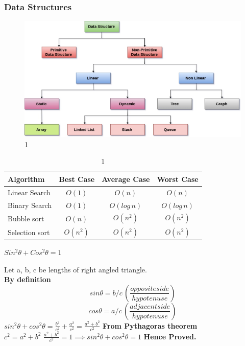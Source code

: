 \documentclass{beamer}
\begin{document}
	\begin{frame}
		\frametitle{Data Structures}
		\begin{figure}
			\includegraphics[scale=0.28]{image 1.jpeg}
			\caption{1}
		\end{figure}
	\end{frame}
	\begin{frame}
		\begin{center}
			\begin{table}
				\begin{tabular}{|l|c|c|c|}
					\hline
					Algorithm & Best Case & Average Case & Worst Case \\ 
					\hline \hline
					Linear Search & $O(1)$ & $O(n)$ & $O(n)$ \\
					Binary Search & $O(1)$ & $O(log\,n)$ & $O(log\,n)$ \\
					Bubble sort & $O(n)$ & $O(n^2)$ & $O(n^2)$ \\ 
					Selection sort & $O(n^2)$ & $O(n^2)$ & $O(n^2)$ \\
					\hline    
				\end{tabular}
				\caption{1}
			\end{table}
		\end{center}
		\begin{theorem}
			$Sin^2 \theta + Cos^2 \theta = 1$
		\end{theorem}
	\end{frame}
	\begin{frame}
		\begin{theorem}
			Let a, b, c be lengths of right angled triangle.\\
			\textbf{By definition}
			$$sin \theta = b/c \, \left(\frac{oppositeside}{hypotenuse}\right)$$
			$$cos \theta = a/c \, \left(\frac{adjacentside}{hypotenuse}\right)$$
			$sin^2 \theta + cos^2 \theta = \frac{b^2}{c^2} + \frac{a^2}{c^2} = \frac{a^2+b^2}{c^2}$ \newline \newline
			\textbf{From Pythagoras theorem} \\ \vspace{0.4cm}
			$c^2 = a^2 + b^2$ \newline \newline
			$\frac{a^2+b^2}{c^2} = 1 \implies sin^2 \theta + cos^2 \theta = 1$ \newline \newline
			\textbf{Hence Proved.}
		\end{theorem}
	\end{frame}
\end{document}
